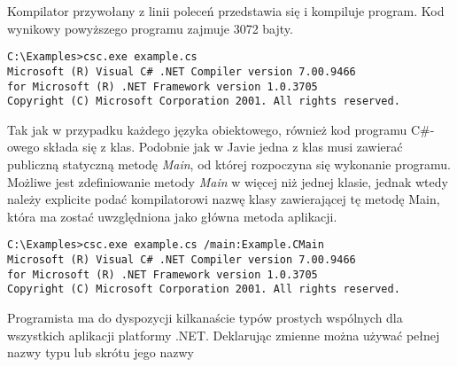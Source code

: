 Kompilator przywołany z linii poleceń przedstawia się i kompiluje program. 
Kod wynikowy powyższego programu zajmuje 3072 bajty. 

\begin{scriptsize}
\begin{verbatim}
C:\Examples>csc.exe example.cs
Microsoft (R) Visual C# .NET Compiler version 7.00.9466
for Microsoft (R) .NET Framework version 1.0.3705
Copyright (C) Microsoft Corporation 2001. All rights reserved.

\end{verbatim}
\end{scriptsize}

Tak jak w przypadku każdego języka obiektowego, również kod programu C\#-owego składa się z klas.
Podobnie jak w Javie jedna z klas musi zawierać publiczną statyczną metodę {\em Main}, od której
rozpoczyna się wykonanie programu. Możliwe jest zdefiniowanie metody {\em Main} w więcej
niż jednej klasie, jednak wtedy należy explicite podać kompilatorowi nazwę klasy zawierającej 
tę metodę Main, która ma zostać uwzględniona jako główna metoda aplikacji.
\label{main_wielerazy}

\begin{scriptsize}
\begin{verbatim}
C:\Examples>csc.exe example.cs /main:Example.CMain
Microsoft (R) Visual C# .NET Compiler version 7.00.9466
for Microsoft (R) .NET Framework version 1.0.3705
Copyright (C) Microsoft Corporation 2001. All rights reserved.

\end{verbatim}
\end{scriptsize}

Programista ma do dyspozycji kilkanaście typów prostych wspólnych dla wszystkich aplikacji 
platformy .NET. Deklarując zmienne można używać pełnej nazwy typu lub skrótu jego nazwy

